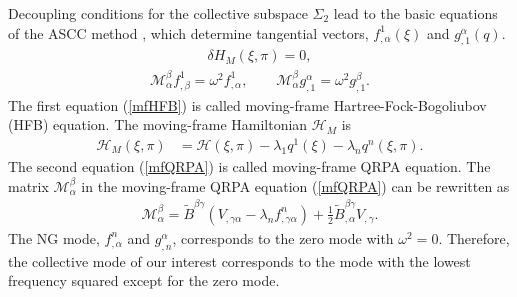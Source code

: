\documentclass[%
superscriptaddress,
showpacs,
nofootinbib,
amsmath,amssymb,
aps,
prc,
twocolumn,
floatfix ]%
{revtex4-1}
\begin{document}
Decoupling conditions for the collective subspace $\Sigma_2$ lead to
the basic equations of the ASCC method \cite{MNM00,N2012},
which determine tangential vectors,
$f^1_{,\alpha}(\xi)$ and $g_{,1}^{\alpha}(q)$.
\begin{align}
  \delta H_M(\xi,\pi) = 0, \label{mfHFB}
  \end{align}\begin{align}
 \mathcal{M}^\beta_\alpha f^1_{,\beta}  = \omega^2 f^1_{,\alpha},\hspace{2em} 
\mathcal{M}^\beta_\alpha g^{\alpha}_{,1} = \omega^2 g^{\beta}_{,1} .
  \label{mfQRPA}
\end{align}
The first equation (\ref{mfHFB}) is called moving-frame
Hartree-Fock-Bogoliubov (HFB) equation.
The moving-frame Hamiltonian $\mathcal{H}_M$
is
\begin{align}
\mathcal{H}_M(\xi,\pi) &= \mathcal{H}(\xi,\pi)
	-\lambda_{1} q^1(\xi) - \lambda_{n} q^n(\xi,\pi) .
\label{H_M}
\end{align}
The second equation (\ref{mfQRPA}) is called moving-frame QRPA equation.
The matrix $\mathcal{M}^\beta_\alpha$ in the moving-frame QRPA
equation (\ref{mfQRPA}) can be rewritten as 
 \begin{align}
\mathcal{M}^{\beta}_{\alpha} =
	 \tilde{B}^{\beta\gamma}
	 \left(V_{,\gamma\alpha}-\lambda_{n}f^n_{,\gamma\alpha}\right)
	+ \frac{1}{2}\tilde{B}^{\beta\gamma}_{,\alpha}V_{,\gamma} 
\label{M}.
\end{align}
The NG mode, $f^n_{,\alpha}$ and $g^\alpha_{,n}$, corresponds to
the zero mode with $\omega^2=0$.
Therefore, the collective mode of our interest corresponds to
the mode with the lowest frequency squared except for the zero mode.
\end{document}

